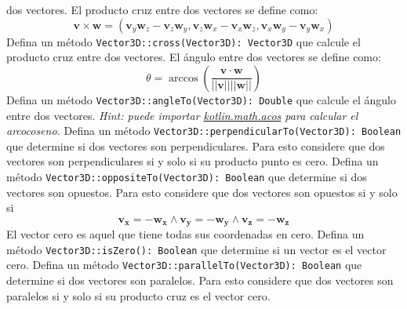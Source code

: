 \begin{Exercise}[title={Algebra Vectorial}]
      dos vectores.
    \Question El producto cruz entre dos vectores se define como:
      \[
        \mathbf{v} \times \mathbf{w} = 
          (\mathbf{v}_y \mathbf{w}_z - \mathbf{v}_z \mathbf{w}_y, 
           \mathbf{v}_z \mathbf{w}_x - \mathbf{v}_x \mathbf{w}_z, 
           \mathbf{v}_x \mathbf{w}_y - \mathbf{v}_y \mathbf{w}_x)
      \]
      Defina un método \texttt{Vector3D::cross(Vector3D): Vector3D} que calcule el producto cruz 
      entre dos vectores.
    \Question El ángulo entre dos vectores se define como:
      \[
        \theta = \arccos{\left(\frac{\mathbf{v} \cdot \mathbf{w}}{||\mathbf{v}|| ||\mathbf{w}||}\right)}
      \]
      Defina un método \texttt{Vector3D::angleTo(Vector3D): Double} que calcule el ángulo entre dos 
      vectores.
      \textit{Hint: puede importar \url{kotlin.math.acos} para calcular el arcocoseno.}
    \Question Defina un método \texttt{Vector3D::perpendicularTo(Vector3D): Boolean} que determine si dos 
      vectores son perpendiculares.
      Para esto considere que dos vectores son perpendiculares si y solo si su producto punto es 
      cero.
    \Question Defina un método \texttt{Vector3D::oppositeTo(Vector3D): Boolean} que determine si dos 
      vectores son opuestos.
      Para esto considere que dos vectores son opuestos si y solo si
      \[
        \mathbf{v_x} = -\mathbf{w_x} \wedge \mathbf{v_y} = -\mathbf{w_y} \wedge 
          \mathbf{v_z} = -\mathbf{w_z}
      \]
    \Question El vector cero es aquel que tiene todas sus coordenadas en cero.
      Defina un método \texttt{Vector3D::isZero(): Boolean} que determine si un vector es el vector 
      cero.
    \Question Defina un método \texttt{Vector3D::parallelTo(Vector3D): Boolean} que determine si dos 
      vectores son paralelos.
      Para esto considere que dos vectores son paralelos si y solo si su producto cruz es el vector 
      cero.
  \end{Exercise}